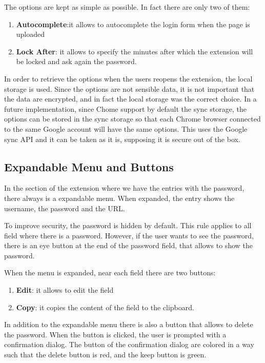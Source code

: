 The options are kept as simple as possible. In fact there are only two of them:

\begin{enumerate}
    \item \textbf{Autocomplete}:it allows to autocomplete the login form when the page is uploaded
    \item \textbf{Lock After}: it allows to specify the minutes after which the extension will be locked and ask again the password.
\end{enumerate}

In order to retrieve the options when the users reopens the extension, the local storage is used. Since the options are not sensible data, it is not important that the data are encrypted, and in fact the local storage was the correct choice. In a future implementation, since Chome support by default the sync storage, the options can be stored in the sync storage so that each Chrome browser connected to the same Google account will have the same options. This uses the Google sync API and it can be taken as it is, supposing it is secure out of the box. 


\subsection{Expandable Menu and Buttons}

In the section of the extension where we have the entries with the password, there always is a expandable menu. When expanded, the entry shows the username, the password and the URL. 

To improve security, the password is hidden by default. This rule applies to all field where there is a password. However, if the user wants to see the password, there is an eye button at the end of the password field, that allows to show the password.

When the menu is expanded, near each field there are two buttons:

\begin{enumerate}
    \item \textbf{Edit}: it allows to edit the field
    \item \textbf{Copy}: it copies the content of the field to the clipboard.
\end{enumerate}

In addition to the expandable menu there is also a button that allows to delete the password. When the button is clicked, the user is prompted with a confirmation dialog. The button of the confirmation dialog are colored in a way such that the delete button is red, and the keep button is green.


